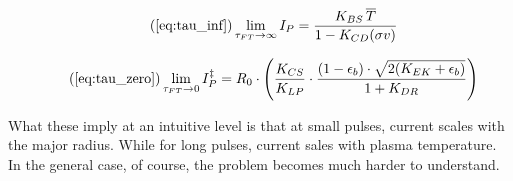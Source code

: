 \begin{equation}
	\tag{\ref{eq:tau_inf}}
	\lim_{\tau_{FT} \to \infty} I_P = \frac{ K_{BS} \, \overline T }{ 1 - K_{CD} ( \sigma v ) }
\end{equation}

\begin{equation}
	\tag{\ref{eq:tau_zero}}
	\lim_{ \tau_{FT} \to 0 } I_P^\ddagger = R_0 \cdot \left( \frac{ K_{CS} }{ K_{LP} } \cdot \frac{ ( 1 - \epsilon_b ) \cdot \sqrt{ 2 ( K_{EK} + \epsilon_b ) } }{ 1 + K_{DR} } \right)
\end{equation}

What these imply at an intuitive level is that at small pulses, current scales with the major radius. While for long pulses, current sales with plasma temperature. In the general case, of course, the problem becomes much harder to understand.

%
